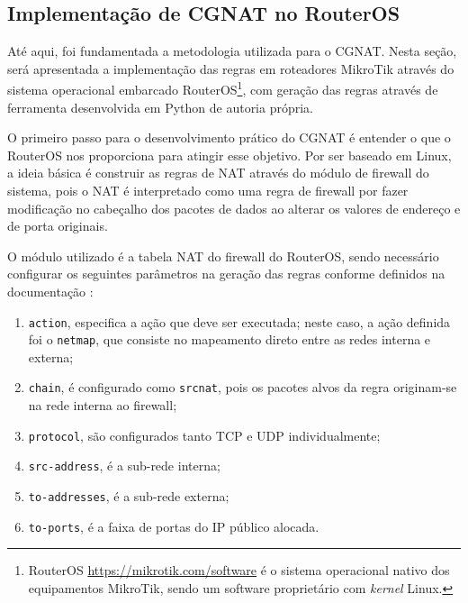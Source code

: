 \subsection{Implementação de CGNAT no RouterOS}

    Até aqui, foi fundamentada a metodologia utilizada para o CGNAT. Nesta seção, será apresentada a implementação das regras em roteadores MikroTik através do sistema operacional embarcado RouterOS\footnote{RouterOS \url{https://mikrotik.com/software} é o sistema operacional nativo dos equipamentos MikroTik, sendo um software proprietário com \textit{kernel} Linux.}, com geração das regras através de ferramenta desenvolvida em Python de autoria própria.
    
    
    O primeiro passo para o desenvolvimento prático do CGNAT é entender o que o RouterOS nos proporciona para atingir esse objetivo. Por ser baseado em Linux, a ideia básica é construir as regras de NAT através do módulo de firewall do sistema, pois o NAT é interpretado como uma regra de firewall por fazer modificação no cabeçalho dos pacotes de dados ao alterar os valores de endereço e de porta originais.

    O módulo utilizado é a tabela NAT do firewall do RouterOS, sendo necessário configurar os seguintes parâmetros na geração das regras conforme definidos na documentação \cite{natmikrotik}:

    \begin{enumerate}[label=\alph*)]
        \item \label{nat:action} {\tt action}, especifica a ação que deve ser executada; neste caso, a ação definida foi o {\tt netmap}, que consiste no mapeamento direto entre as redes interna e externa;
        
        \item \label{nat:chain} {\tt chain}, é configurado como {\tt srcnat}, pois os pacotes alvos da regra originam-se na rede interna ao firewall; 
        
        \item \label{nat:protocol} {\tt protocol}, são configurados tanto TCP e UDP individualmente; 
        
        \item \label{nat:srcaddress} {\tt src-address}, é a sub-rede interna;
        
        \item \label{nat:toaddress} {\tt to-addresses}, é a sub-rede externa;
        
        \item \label{nat:toports} {\tt to-ports}, é a faixa de portas do IP público alocada.
    \end{enumerate}

